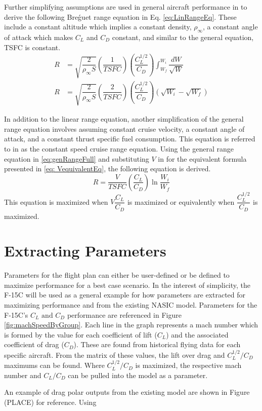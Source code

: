 Further simplifying assumptions are used in general aircraft performance in \cite{IntroACMechanics} to derive the following Bre\'guet range equation in Eq. \ref{eq:LinRangeEq}. These include a constant altitude which implies a constant density, $\rho_{\infty}$, a constant angle of attack which makes $C_L$ and $C_D$ constant, and similar to the general equation, TSFC is constant.
\begin{equation}
\label{eq:LinRangeEq}
    \begin{aligned}
        R &= \sqrt{\dfrac{2}{\rho_{\infty}S}}\left(\dfrac{1}{TSFC}\right)\left(\dfrac{C_L^{1/2}}{C_D}\right)\int_{W_f}^{W_i}\dfrac{dW}{\sqrt{W}}\\
        R &= \sqrt{\dfrac{2}{\rho_{\infty}S}}\left(\dfrac{2}{TSFC}\right)\left(\dfrac{C_L^{1/2}}{C_D}\right)(\sqrt{W_i}-\sqrt{W_f})
    \end{aligned}
\end{equation} \par
In addition to the linear range equation, another simplification of the general range equation involves assuming constant cruise velocity, a constant angle of attack, and a constant thrust specific fuel consumption. This equation is referred to in \cite{IntroACMechanics} as the constant speed cruise range equation. Using the general range equation in \ref{eq:genRangeFull} and substituting $V$ in for the equivalent formula presented in \ref{eq: VequivalentEq}, the following equation is derived.
\begin{equation}
    R = \dfrac{V}{TSFC}\left(\dfrac{C_L}{C_D}\right)\ln{\dfrac{W_i}{W_f}}
\end{equation}
This equation is maximized when $V\dfrac{C_L}{C_D}$ is maximized or equivalently when $\dfrac{C_L^{1/2}}{C_D}$ is maximized.

\section{Extracting Parameters}
Parameters for the flight plan can either be user-defined or be defined to maximize performance for a best case scenario. In the interest of simplicity, the F-15C will be used as a general example for how parameters are extracted for maximizing performance and from the existing NASIC model. Parameters for the F-15C's $C_L\text{ and }C_D$ performance are referenced in Figure \ref{fig:machSpeedByGroup}. Each line in the graph represents a mach number which is formed by the value for each coefficient of lift ($C_L$) and the associated coefficient of drag ($C_D$). These are found from historical flying data for each specific aircraft. From the matrix of these values, the lift over drag and $C_L^{1/2}/C_D$ maximums can be found. Where $C_L^{1/2}/C_D$ is maximized, the respective mach number and $C_L/C_D$ can be pulled into the model as a parameter.\par
An example of drag polar outputs from the existing model are shown in Figure (PLACE) for reference. Using 

